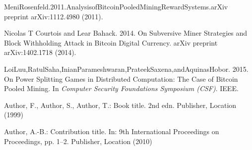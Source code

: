 \documentclass[a4paper, 11pt]{article}
\begin{document}
\begin{CJK*}{UTF8}{gbsn}
\begin{thebibliography}{8}
    MeniRosenfeld.2011.AnalysisofBitcoinPooledMiningRewardSystems.arXiv
    preprint arXiv:1112.4980 (2011).

    Nicolas T Courtois and Lear Bahack. 2014. 
    On Subversive Miner Strategies and Block Withholding Attack in Bitcoin Digital Currency. 
    arXiv preprint arXiv:1402.1718 (2014).

    LoiLuu,RatulSaha,InianParameshwaran,PrateekSaxena,andAquinasHobor. 2015. 
    On Power Splitting Games in Distributed Computation: The Case of Bitcoin Pooled Mining. 
    In \textit{Computer Security Foundations Symposium (CSF)}. IEEE.

    Author, F., Author, S., Author, T.: Book title. 2nd edn. Publisher,
    Location (1999)
    
    Author, A.-B.: Contribution title. In: 9th International Proceedings
    on Proceedings, pp. 1--2. Publisher, Location (2010)

    
    
    \end{thebibliography}
    
    \end{CJK*}
    
    
\end{document}
